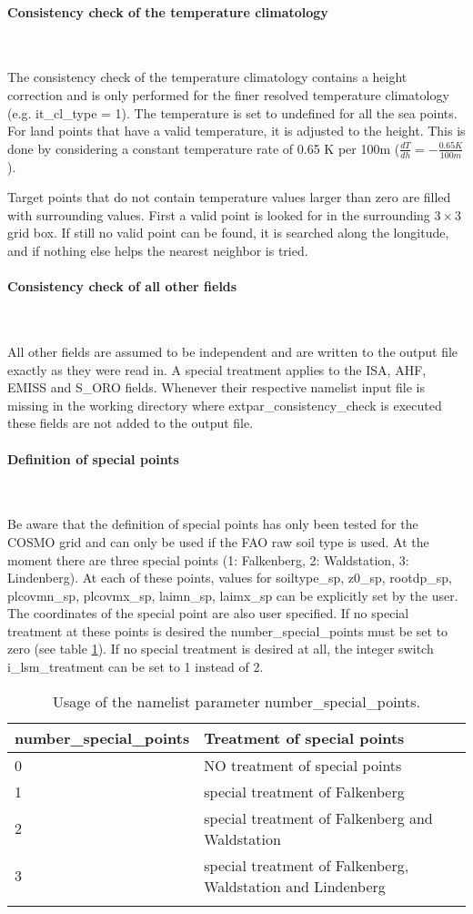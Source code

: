 \documentclass[a4paper,10pt,DIV14,BCOR1cm,titlepage,twoside]{scrartcl}
\providecommand{\tabularnewline}{\\}
\begin{document}
\paragraph{Consistency check of the temperature climatology}\ \par\medskip\noindent
The consistency check of the temperature climatology contains a height correction and is only performed for the finer resolved temperature climatology (e.g. it\_cl\_type = 1). The temperature is set to undefined for all the sea points. For land points that have a valid temperature, it is adjusted to the height. This is done by considering a constant temperature rate of 0.65 K per 100m ($\frac{dT}{dh} = -\frac{0.65 K}{100 m}$). \par\medskip\noindent
Target points that do not contain temperature values larger than zero are filled with surrounding values. First a valid point is looked for in the surrounding $3\times3$ grid box. If still no valid point can be found, it is searched along the longitude, and if nothing else helps the nearest neighbor is tried.
\paragraph{Consistency check of all other fields}\ \par\medskip\noindent
All other fields are assumed to be independent and are written to the output file exactly as they were read in. A special treatment applies to the ISA, AHF, EMISS and S\_ORO fields. Whenever their respective namelist input file is missing in the working directory where extpar\_consistency\_check is executed these fields are not added to the output file. 
\paragraph{Definition of special points}\ \par\medskip\noindent
Be aware that the definition of special points has only been tested for the COSMO grid and can only be used if the FAO raw soil type is used. At the moment there are three special points (1: Falkenberg, 2: Waldstation, 3: Lindenberg). At each of these points, values for soiltype\_sp, z0\_sp, rootdp\_sp, plcovmn\_sp, plcovmx\_sp, laimn\_sp, laimx\_sp can be explicitly set by the user. The coordinates of the special point are also user specified. If no special treatment at these points is desired the number\_special\_points must be set to zero (see table \ref{tab:number_special_points}). If no special treatment is desired at all, the integer switch i\_lsm\_treatment can be set to 1 instead of 2. \par\medskip\noindent
\begin{longtable}{p{4.25cm}|p{10.25cm}}
\textbf{number\_special\_points} & \textbf{Treatment of special points}  \tabularnewline
\hline
\endhead
\hline
0 & NO treatment of special points \tabularnewline
1 & special treatment of Falkenberg \tabularnewline
2 & special treatment of Falkenberg and Waldstation \tabularnewline
3 & special treatment of Falkenberg, Waldstation and Lindenberg \tabularnewline
\bottomrule
\caption{Usage of the namelist parameter number\_special\_points.}
\label{tab:number_special_points}
\end{longtable}
\end{document}
